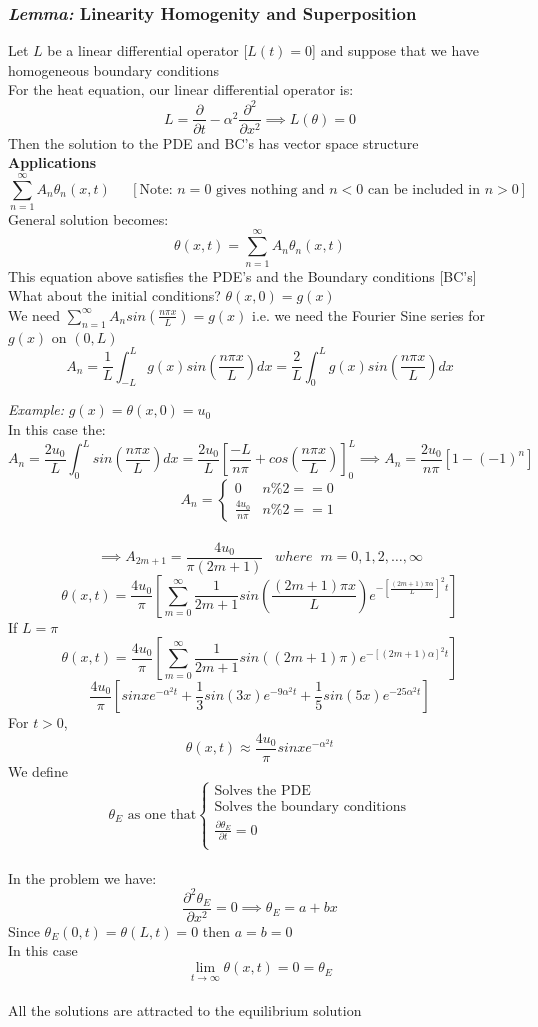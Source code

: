 \documentclass[11pt]{article}
\theoremstyle{definition}
\newcommand{\pd}{{\partial}}
\newcommand*{\pdo}[2]{\frac{\pd{#1}}{\pd{#2}}}%
\newcommand*{\pdt}[2]{\frac{\pd^2{#1}}{\pd{#2}^2}}
\begin{document}
\subsubsection{\textit{Lemma:} Linearity Homogenity and Superposition}
Let $L$ be a linear differential operator [$L(t) = 0$] and suppose that we have homogeneous boundary conditions\\
For the heat equation, our linear differential operator is: 
$$L = \pdo{}{t} - \alpha^2\pdt{}{x} \implies L(\theta) = 0$$
Then the solution to the PDE and BC's has vector space structure\\
\textbf{Applications}\\
$$\sum^\infty_{n=1}A_n\theta_n(x,t) \;\;\;\;\; [\text{Note: } n = 0 \text{ gives nothing and } n < 0 \text{ can be included in } n>0]$$
General solution becomes:
$$\theta(x,t) = \sum^\infty_{n=1}A_n\theta_n(x,t)$$
This equation above satisfies the PDE's and the Boundary conditions [BC's]
What about the initial conditions?
$\theta(x,0) = g(x)$\\
We need $\sum^\infty_{n = 1}A_nsin(\frac{n\pi x}{L}) = g(x)$ i.e. we need the Fourier Sine series for $g(x)$ on $(0,L)$
$$A_n = \frac{1}{L}\int^L_{-L} g(x) sin(\frac{n\pi x}{L}) dx = \frac{2}{L}\int^L_0 g(x) sin(\frac{n\pi x}{L}) dx$$

\textit{Example:} $g(x) = \theta(x,0) = u_0$\\
In this case the:
$$A_n = \frac{2u_0}{L}\int^L_0sin(\frac{n\pi x}{L}) dx =  \frac{2u_0}{L} [\frac{-L}{n\pi} + cos(\frac{n\pi x}{L})]_0^L \implies A_n = \frac{2u_0}{n\pi}[1-(-1)^n]$$
\[A_n =  \begin{cases} 
      0 & n\%2 == 0 \\
      \frac{4u_0}{n\pi} & n\%2 == 1
   \end{cases}
\]\\
$$\implies A_{2m+1} = \frac{4u_0}{\pi(2m + 1)}\;\; \;where\;\; m = 0,1,2,\dots,\infty$$
$$\theta(x,t) = \frac{4u_0}{\pi}[\sum^\infty_{m=0}\frac{1}{2m+1}sin(\frac{(2m+1)\pi x}{L})e^{-[{\frac{(2m+1)\pi \alpha}{L}}]^2t}]$$
If $L = \pi$
$$\theta(x,t) = \frac{4u_0}{\pi}[\sum^\infty_{m=0}\frac{1}{2m+1}sin((2m+1)\pi)e^{-[(2m+1) \alpha]^2t}]$$
$$\frac{4u_0}{\pi} [sinx e^{-\alpha^2 t} + \frac{1}{3}sin(3x) e^{-9\alpha^2 t} + \frac{1}{5}sin(5x) e^{-25\alpha^2 t}]$$
For $t>0$,
$$\theta(x,t) \approx \frac{4u_0}{\pi} sinx e^{-\alpha^2 t}$$
We define 
\[\theta_E \text{ as one that}  \begin{cases} 
      \text{Solves the PDE} \\
      \text{Solves the boundary conditions} \\ 
       \pdo{\theta_E}{t} = 0\\ 
   \end{cases}
\]\\
In the problem we have:
$$\pdt{\theta_E}{x} = 0 \implies \theta_E = a + bx $$
Since $\theta_E(0,t) = \theta(L,t) = 0$ then $a = b  = 0$ \\
In this case $$\lim_{t \to \infty} \theta(x,t) = 0 = \theta_E$$\\
All the solutions are attracted to the equilibrium solution
\end{document}
